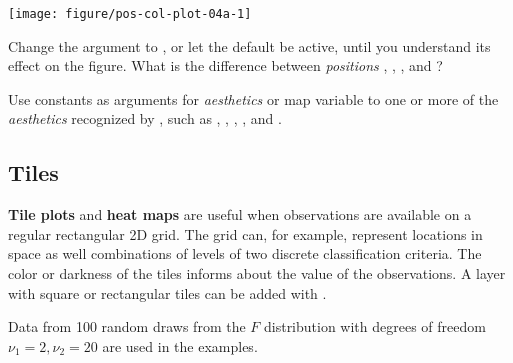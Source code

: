 \documentclass[krantz2]{krantz}\usepackage{knitr}
\begin{document}
\begin{knitrout}\footnotesize
{}\color{fgcolor}\begin{kframe}
\begin{alltt}
 \hlopt{+} 
\end{alltt}
\end{kframe}

{\centering \texttt{[image: figure/pos-col-plot-04a-1]} 

}


\end{knitrout}



\begin{playground}
Change the argument to , or let the default be active, until you understand its effect on the figure. What is the difference between \emph{positions} , , , and ?
\end{playground}

\begin{playground}
Use constants as arguments for \emph{aesthetics} or map variable  to one or more of the \emph{aesthetics} recognized by , such as , , , ,  and .
\end{playground}


\subsection{Tiles}\label{sec:tileplot}
\textbf{Tile plots} and \textbf{heat maps} are useful when observations are available on a regular rectangular 2D grid. The grid can, for example, represent locations in space as well combinations of levels of two discrete classification criteria. The color or darkness of the tiles informs about the value of the observations. A layer with square or rectangular tiles can be added with .

Data from 100 random draws from the $F$ distribution with degrees of freedom $\nu_1 = 2, \nu_2 = 20$ are used in the examples.
\end{document}
